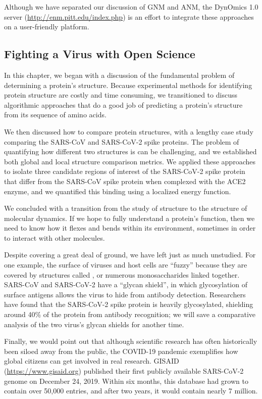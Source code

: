 Although we have separated our discussion of GNM and ANM, the DynOmics 1.0 server (\url{http://enm.pitt.edu/index.php}) is an effort to integrate these approaches on a user-friendly platform. 

\FloatBarrier
{}
\subsection{Fighting a Virus with Open Science}

In this chapter, we began with a discussion of the fundamental problem of determining a protein's structure. Because experimental methods for identifying protein structure are costly and time consuming, we transitioned to discuss algorithmic approaches that do a good job of predicting a protein's structure from its sequence of amino acids.

We then discussed how to compare protein structures, with a lengthy case study comparing the SARS-CoV and SARS-CoV-2 spike proteins. The problem of quantifying how different two structures is can be challenging, and we established both global and local structure comparison metrics. We applied these approaches to isolate three candidate regions of interest of the SARS-CoV-2 spike protein that differ from the SARS-CoV spike protein when complexed with the ACE2 enzyme, and we quantified this binding using a localized energy function.

We concluded with a transition from the study of structure to the structure of molecular dynamics. If we hope to fully understand a protein's function, then we need to know how it flexes and bends within its environment, sometimes in order to interact with other molecules.

Despite covering a great deal of ground, we have left just as much unstudied. For one example, the surface of viruses and host cells are ``fuzzy'' because they are covered by structures called , or numerous monosaccharides linked together. SARS-CoV and SARS-CoV-2 have a “glycan shield”, in which glycosylation of surface antigens allows the virus to hide from antibody detection. Researchers have found that the SARS-CoV-2 spike protein is heavily glycosylated, shielding around 40\% of the protein from antibody recognition; we will save a comparative analysis of the two virus's glycan shields for another time.

Finally, we would point out that although scientific research has often historically been siloed away from the public, the COVID-19 pandemic exemplifies how global citizens can get involved in real research. GISAID (\url{https://www.gisaid.org}) published their first publicly available SARS-CoV-2 genome on December 24, 2019. Within six months, this database had grown to contain over 50,000 entries, and after two years, it would contain nearly 7 million.

